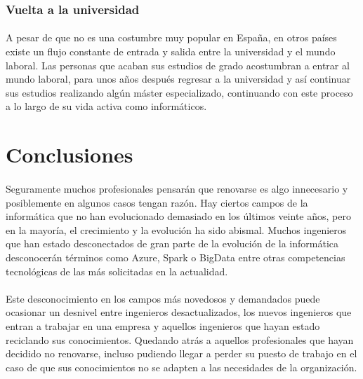 \documentclass[12pt, a4paper]{report}
\begin{document}
    		\subsubsection{Vuelta a la universidad}
        		\paragraph{}
        		A pesar de que no es una costumbre muy popular en España, en otros países existe un flujo constante de entrada y salida entre la universidad y el mundo laboral. Las personas que acaban sus estudios de grado acostumbran a entrar al mundo laboral, para unos años después regresar a la universidad y así continuar sus estudios realizando algún máster especializado, continuando con este proceso a lo largo de su vida activa como informáticos.
        
                
    \section{Conclusiones}
    	\paragraph{}
        Seguramente muchos profesionales pensarán que renovarse es algo innecesario y posiblemente en algunos casos tengan razón. Hay ciertos campos de la informática que no han evolucionado demasiado en los últimos veinte años, pero en la mayoría, el crecimiento y la evolución ha sido abismal. Muchos ingenieros que han estado desconectados de gran parte de la evolución de la informática desconocerán términos como Azure, Spark o BigData entre otras competencias tecnológicas de las más solicitadas en la actualidad\cite{universia:competencias}.
        
        \paragraph{}
        Este desconocimiento en los campos más novedosos y demandados puede ocasionar un desnivel entre ingenieros desactualizados, los nuevos ingenieros que entran a trabajar en una empresa y aquellos ingenieros que hayan estado reciclando sus conocimientos. Quedando atrás a aquellos profesionales que hayan decidido no renovarse, incluso pudiendo llegar a perder su puesto de trabajo en el caso de que sus conocimientos no se adapten a las necesidades de la organización.
        
\end{document}
